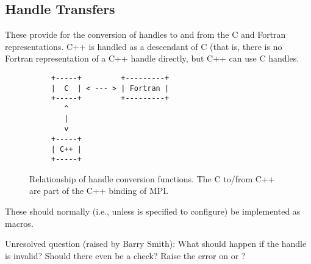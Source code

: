 \documentclass{article}
\begin{document}
\subsection{Handle Transfers}
These provide for the conversion of handles to and from the C and
Fortran representations.  C++ is handled as a descendant of C (that
is, there is no Fortran representation of a C++ handle directly, but
C++ can use C handles.  
\begin{figure}
\begin{verbatim}
     +-----+         +---------+
     |  C  | < --- > | Fortran |
     +-----+         +---------+
        ^
        |
        v
     +-----+ 
     | C++ | 
     +-----+ 
\end{verbatim}
\caption{Relationship of handle conversion functions.  The C to/from
C++ are part of the C++ binding of MPI.}\label{fig:handle-transfers}
\end{figure}
These should normally (i.e., unless
 is
specified to configure) be implemented as macros.  

Unresolved question (raised by Barry Smith):  What should happen if
the handle is invalid?  Should there even be a check?  Raise the error
on  or ?

\subsubsection{}
\subsubsection{}
\subsubsection{}
\subsubsection{}
\subsubsection{}
\subsubsection{}
\subsubsection{}
\end{document}
